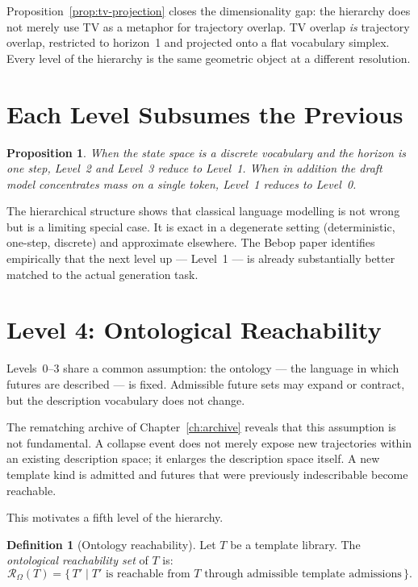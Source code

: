 \documentclass[11pt, a4paper, openany]{book}
\theoremstyle{plain}
\newtheorem{proposition}[theorem]{Proposition}
\theoremstyle{definition}
\newtheorem{definition}[theorem]{Definition}
\theoremstyle{remark}
\begin{document}
Proposition~\ref{prop:tv-projection} closes the dimensionality gap:
the hierarchy does not merely use TV as a metaphor for trajectory overlap.
TV overlap \emph{is} trajectory overlap, restricted to horizon~1 and
projected onto a flat vocabulary simplex.
Every level of the hierarchy is the same geometric object at a different resolution.

\section{Each Level Subsumes the Previous}

\begin{proposition}
  When the state space is a discrete vocabulary and the horizon is one step,
  Level~2 and Level~3 reduce to Level~1.
  When in addition the draft model concentrates mass on a single token,
  Level~1 reduces to Level~0.
\end{proposition}

The hierarchical structure shows that classical language modelling is not
wrong but is a limiting special case.
It is exact in a degenerate setting (deterministic, one-step, discrete)
and approximate elsewhere.
The Bebop paper identifies empirically that the next level up --- Level~1 ---
is already substantially better matched to the actual generation task.

\section{Level 4: Ontological Reachability}

Levels~0--3 share a common assumption: the ontology --- the language in which
futures are described --- is fixed.
Admissible future sets may expand or contract, but the description vocabulary
does not change.

The rematching archive of Chapter~\ref{ch:archive} reveals that this assumption
is not fundamental.
A collapse event does not merely expose new trajectories within an existing
description space; it enlarges the description space itself.
A new template kind is admitted and futures that were previously indescribable
become reachable.

This motivates a fifth level of the hierarchy.

\begin{definition}[Ontology reachability]
  Let $T$ be a template library.
  The \emph{ontological reachability set} of $T$ is:
  \[
    \mathcal{R}_\Omega(T)
    = \bigl\{\, T' \;\big|\;
        T' \text{ is reachable from } T
        \text{ through admissible template admissions} \,\bigr\}.
  \]
\end{definition}
\end{document}

